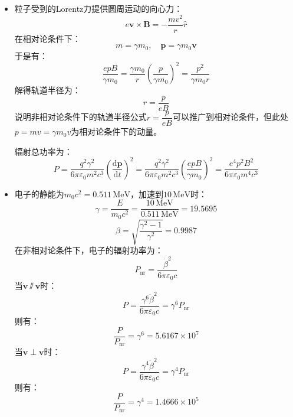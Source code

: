 \documentclass[a4paper,fontset=none]{ctexart}
\begin{document}
\begin{itemize}

    \item[2.]
    粒子受到的Lorentz力提供圆周运动的向心力：
    \[
        e\bm{v} \times \bm{B} = -\frac{mv^2}{r}\hat{r}
    \]
    在相对论条件下：
    \[
        m = \gamma m_0,\quad \bm{p} = \gamma m_0\bm{v}
    \]
    于是有：
    \[
        \frac{epB}{\gamma m_0} = \frac{\gamma m_0}{r}\left(\frac{p}{\gamma m_0}\right)^2 = \frac{p^2}{\gamma m_0r}
    \]
    解得轨道半径为：
    \[
        r = \frac{p}{eB}
    \]
    说明非相对论条件下的轨道半径公式$r=\dfrac{p}{eB}$可以推广到相对论条件，但此处$p=mv=\gamma m_0v$为相对论条件下的动量。

    辐射总功率为：
    \[
        P = \frac{q^2\gamma^2}{6\pi\varepsilon_0m^2c^3}\left(\frac{\mathrm{d}\bm{p}}{\mathrm{d}t}\right)^2 = \frac{q^2\gamma^2}{6\pi\varepsilon_0m^2c^3} \left(\frac{epB}{\gamma m_0}\right)^2 = \frac{e^4p^2B^2}{6\pi\varepsilon_0m^4c^3}
    \]

    \item[3.]
    电子的静能为$m_0c^2=0.511\,\mathrm{MeV}$，加速到$10\,\mathrm{MeV}$时：
    \[
        \gamma = \frac{E}{m_0c^2} = \frac{10\,\mathrm{MeV}}{0.511\,\mathrm{MeV}} = 19.5695
    \]
    \[
        \beta = \sqrt{\frac{\gamma^2-1}{\gamma^2}} = 0.9987
    \]
    在非相对论条件下，电子的辐射功率为：
    \[
        P_{\mathrm{nr}} = \frac{\dot{\beta}^2}{6\pi\varepsilon_0c}
    \]
    当$\dot{\bm{v}}\varparallel\bm{v}$时：
    \[
        P = \frac{\gamma^6\dot{\beta}^2}{6\pi\varepsilon_0c} = \gamma^6P_{\mathrm{nr}}
    \]
    则有：
    \[
        \frac{P}{P_{\mathrm{nr}}} = \gamma^6 = 5.6167 \times 10^7
    \]
    当$\dot{\bm{v}}\perp\bm{v}$时：
    \[
        P = \frac{\gamma^4\dot{\beta}^2}{6\pi\varepsilon_0c} = \gamma^4P_{\mathrm{nr}}
    \]
    则有：
    \[
        \frac{P}{P_{\mathrm{nr}}} = \gamma^4 = 1.4666 \times 10^5
    \]

\end{itemize}
\end{document}
